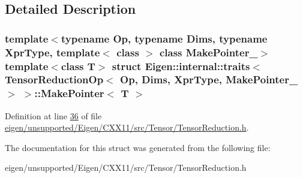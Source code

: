 \subsection{Detailed Description}
\subsubsection*{template$<$typename Op, typename Dims, typename Xpr\+Type, template$<$ class $>$ class Make\+Pointer\+\_\+$>$\newline
template$<$class T$>$\newline
struct Eigen\+::internal\+::traits$<$ Tensor\+Reduction\+Op$<$ Op, Dims, Xpr\+Type, Make\+Pointer\+\_\+ $>$ $>$\+::\+Make\+Pointer$<$ T $>$}



Definition at line \hyperlink{eigen_2unsupported_2_eigen_2_c_x_x11_2src_2_tensor_2_tensor_reduction_8h_source_l00036}{36} of file \hyperlink{eigen_2unsupported_2_eigen_2_c_x_x11_2src_2_tensor_2_tensor_reduction_8h_source}{eigen/unsupported/\+Eigen/\+C\+X\+X11/src/\+Tensor/\+Tensor\+Reduction.\+h}.



The documentation for this struct was generated from the following file\+:\begin{DoxyCompactItemize}
\item 
eigen/unsupported/\+Eigen/\+C\+X\+X11/src/\+Tensor/\+Tensor\+Reduction.\+h\end{DoxyCompactItemize}
